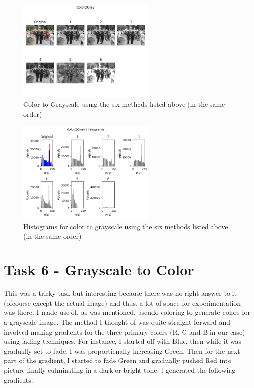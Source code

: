 \documentclass[notitlepage]{report}
\begin{document}
\begin{figure}[htp]
    \centering
    \hypertarget{C2G}{\includegraphics[width = 0.6\textwidth]{C2G.png}}
    \caption{Color to Grayscale using the six methods listed above (in the same order)}
    \label{fig8:sysfig}
\end{figure}

\begin{figure}[htp]
    \centering
    \hypertarget{C2G_Hist}{\includegraphics[width = 0.6\textwidth]{C2G_Hist.png}}
    \caption{Histograms for color to grayscale using the six methods listed above (in the same order)}
    \label{fig9:sysfig}
\end{figure}

\section{Task 6 - Grayscale to Color}
This was a tricky task but interesting because there was no right answer to it (ofcourse except the actual image) and thus, a lot of 
space for experimentation was there. I made use of, as was mentioned, pseudo-coloring to generate colors for a grayscale image. The method
I thought of was quite straight forward and involved making gradients for the three primary colors (R, G and B in our case) using fading techniques.
For instance, I started off with Blue, then while it was gradually set to fade, I was proportionally increasing Green. Then for the next part of
the gradient, I started to fade Green and gradually pushed Red into picture finally culminating in a dark or bright tone. I generated the following 
gradients:
\end{document}
